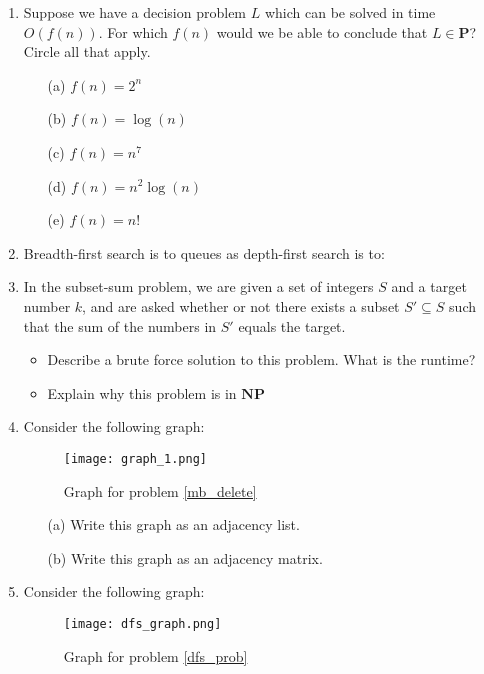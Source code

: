 \documentclass[12pt]{article}
\begin{document}
\begin{enumerate}
\begin{itemize}
    \end{itemize}
    \item Suppose we have a decision problem $L$ which can be solved in time $O(f(n))$. For which $f(n)$ would we be able to conclude that $L \in \mathbf{P}$? Circle all that apply.
    \begin{itemize}
        \item[(a)] $f(n) = 2^n$
        \item[(b)] $f(n) = \log(n)$
        \item[(c)] $f(n) = n^7$
        \item[(d)] $f(n) = n^2\log(n)$
        \item[(e)] $f(n) = n!$  
    \end{itemize}
    \item Breadth-first search is to queues as depth-first search is to: 
    \item In the subset-sum problem, we are given a set of integers $S$ and a target number $k$, and are asked whether or not there exists a subset $S' \subseteq S$ such that the sum of the numbers in $S'$ equals the target. 
    \begin{itemize}
        \item Describe a brute force solution to this problem. What is the runtime? \vspace{5cm}
        \item Explain why this problem is in $\textbf{NP}$ \vspace{7cm}
    \end{itemize}
    \newpage
    \item Consider the following graph:
    \begin{figure}[h]
        \centering
        \caption{Graph for problem \ref{mb_delete}}
        \texttt{[image: graph\_1.png]}
    \end{figure}
    \begin{itemize}
        \item[(a)] Write this graph as an adjacency list.
        \item[(b)] Write this graph as an adjacency matrix.
    \end{itemize} \label{mb_delete}
    \newpage
    \item Consider the following graph: 
    \begin{figure}[h]
        \centering
        \caption{Graph for problem \ref{dfs_prob}}
        \texttt{[image: dfs\_graph.png]}
    \end{figure}

\end{enumerate}
\end{document}
